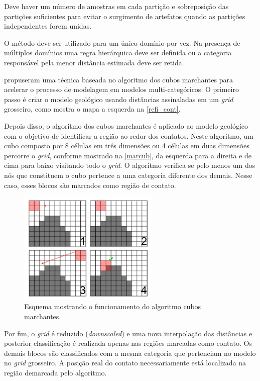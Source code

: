 Deve haver um número de amostras em cada partição e sobreposição das partições suficientes para evitar o surgimento de artefatos quando as partições independentes forem unidas.

O método deve ser utilizado para um único domínio por vez. Na presença de múltiplos domínios uma regra hierárquica deve ser definida ou a categoria responsável pela menor distância estimada deve ser retida.

 \label{bound_ref}

 propuseram uma técnica baseada no algoritmo dos cubos marchantes \cite{lorensen1987marching} para acelerar o processo de modelagem em modelos multi-categóricos. O primeiro passo é criar o modelo geológico usando distâncias assinaladas em um \textit{grid} grosseiro, como mostra o mapa a esquerda na \autoref{refi_cont}. 

Depois disso, o algoritmo dos cubos marchantes é aplicado ao modelo geológico com o objetivo de identificar a região ao redor dos contatos. Neste algoritmo, um cubo composto por 8 células em três dimensões ou 4 células em duas dimensões percorre o \textit{grid}, conforme mostrado na \autoref{marcub}, da esquerda para a direita e de cima para baixo visitando todo o \textit{grid}. O algoritmo verifica se pelo menos um dos nós que constituem o cubo pertence a uma categoria diferente dos demais. Nesse caso, esses blocos são marcados como região de contato. 

\begin{figure}[H]
\caption{\label{marcub} Esquema mostrando o funcionamento do algoritmo cubos marchantes.}
	\centering
		\includegraphics[width=0.6\textwidth]{capitulo_2/imagens/marching_cubes.png}
\end{figure}

Por fim, o \textit{grid} é reduzido (\textit{downscaled}) e uma nova interpolação das distâncias e posterior classificação é realizada apenas nas regiões marcadas como contato. Os demais blocos são classificados com a mesma categoria que pertenciam no modelo no \textit{grid} grosseiro. A posição real do contato necessariamente está localizada na região demarcada pelo algoritmo.

